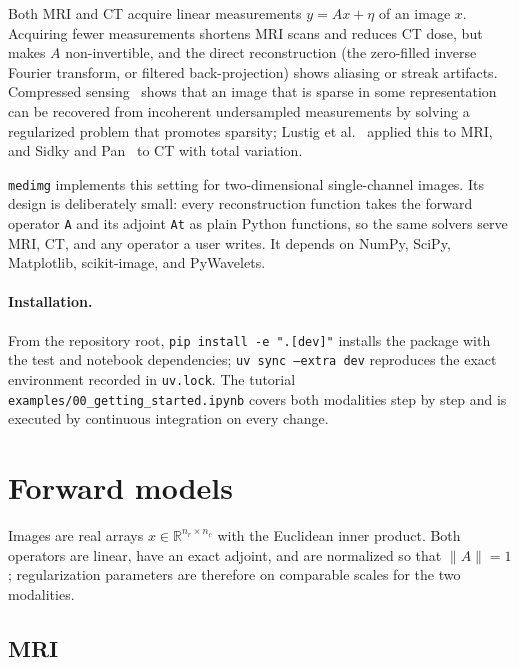 \documentclass[11pt,a4paper]{article}
\newcommand{\code}[1]{\texttt{#1}}
\begin{document}
Both MRI and CT acquire linear measurements $y = Ax + \eta$ of an image $x$.
Acquiring fewer measurements shortens MRI scans and reduces CT dose, but
makes $A$ non-invertible, and the direct reconstruction (the zero-filled
inverse Fourier transform, or filtered back-projection) shows aliasing or
streak artifacts. Compressed sensing~\cite{CandesRombergTao2006,Donoho2006}
shows that an image that is sparse in some representation can be recovered
from incoherent undersampled measurements by solving a regularized problem
that promotes sparsity; Lustig et al.~\cite{LustigDonohoPauly2007} applied
this to MRI, and Sidky and Pan~\cite{SidkyPan2008} to CT with total
variation.

\texttt{medimg} implements this setting for two-dimensional single-channel
images. Its design is deliberately small: every reconstruction function takes
the forward operator \code{A} and its adjoint \code{At} as plain Python
functions, so the same solvers serve MRI, CT, and any operator a user
writes. It depends on NumPy, SciPy, Matplotlib, scikit-image, and
PyWavelets.

\paragraph{Installation.} From the repository root,
\code{pip install -e ".[dev]"} installs the package with the test and
notebook dependencies; \code{uv sync --extra dev} reproduces the exact
environment recorded in \code{uv.lock}. The tutorial
\code{examples/00\_getting\_started.ipynb} covers both modalities step by
step and is executed by continuous integration on every change.

\section{Forward models}

Images are real arrays $x\in\mathbb R^{n_r\times n_c}$ with the Euclidean
inner product. Both operators are linear, have an exact adjoint, and are
normalized so that $\|A\|=1$; regularization parameters are therefore on
comparable scales for the two modalities.

\subsection{MRI}
\end{document}

